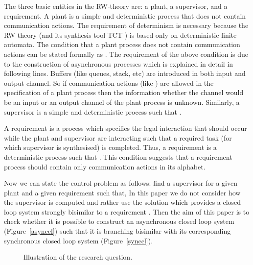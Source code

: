 \documentclass[a4paper,english,final]{article}
\theoremstyle{plain}
\theoremstyle{definition}
\begin{document}
The three basic entities in the RW-theory are: a plant, a supervisor, and a requirement. A plant is a simple and deterministic process  that does not contain communication actions. The requirement of determinism is necessary because the RW-theory (and its synthesis tool TCT \citep{W:2008}) is based only on deterministic finite automata. The condition that a plant process does not contain communication actions can be stated formally as . The requirement of the above condition is due to the construction of asynchronous processes which is explained in detail in following lines. Buffers (like queues, stack, etc) are introduced in both input and output channel. So if communication actions (like ) are allowed in the specification of a plant process then the information whether the channel  would be an input or an output channel of the plant process is unknown. Similarly, a supervisor is a simple and deterministic process  such that .

A requirement is a process which specifies the legal interaction that should occur while the plant and supervisor are interacting such that a required task (for which supervisor is synthesised) is completed. Thus, a requirement is a deterministic process  such that . This condition suggests that a requirement process should contain only communication actions in its alphabet.

Now we can state the control problem as follows: find a supervisor  for a given plant  and a given requirement  such that,  In this paper we do not consider how the supervisor is computed and rather use the solution \citep{W:2008} which provides a closed loop system  strongly bisimilar to a requirement . Then the aim of this paper is to check whether it is possible to construct an asynchronous closed loop system (Figure~\ref{asynccl}) such that it is branching bisimilar with its corresponding synchronous closed loop system (Figure~\ref{synccl}).

\begin{figure}\centering
{}
\caption{Illustration of the research question.}\label{cm}
\end{figure}
\end{document}
